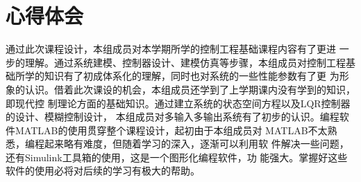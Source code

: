 \section{心得体会}
通过此次课程设计，本组成员对本学期所学的控制工程基础课程内容有了更进
一步的理解。通过系统建模、控制器设计、建模仿真等步骤，本组成员对控制工程基
础所学的知识有了初成体系化的理解，同时也对系统的一些性能参数有了更
为形象的认识。借着此次课设的机会，本组成员还学到了上学期课内没有学到的知识，即现代控
制理论方面的基础知识。通过建立系统的状态空间方程以及LQR控制器的设计、模糊控制设计，
本组成员对多输入多输出系统有了初步的认识。编程软件MATLAB的使用贯穿整个课程设计，起初由于本组成员对
MATLAB不太熟悉，编程起来略有难度，但随着学习的深入，逐渐可以利用软
件解决一些问题，还有Simulink工具箱的使用，这是一个图形化编程软件，功
能强大。掌握好这些软件的使用必将对后续的学习有极大的帮助。






